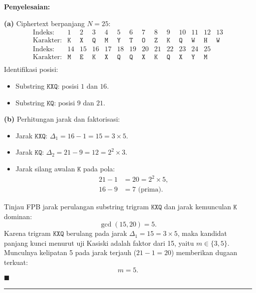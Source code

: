 \documentclass[11pt,a4paper]{article}
\newenvironment{solusi}{\noindent\textbf{\textsf{Penyelesaian:}}\par\vspace{0.2em}}{\hfill$\blacksquare$\vspace{1em}\par\hrule\vspace{1em}}
\begin{document}
\begin{solusi}
\textbf{(a)} Ciphertext berpanjang $N = 25$:
\[
\begin{array}{l*{13}{c}}
\text{Indeks:} & 1 & 2 & 3 & 4 & 5 & 6 & 7 & 8 & 9 & 10 & 11 & 12 & 13 \\
\text{Karakter:} & \texttt{K} & \texttt{X} & \texttt{Q} & \texttt{M} & \texttt{Y} & \texttt{T} & \texttt{O} & \texttt{Z} & \texttt{K} & \texttt{Q} & \texttt{W} & \texttt{H} & \texttt{W} \\[0.5em]
\text{Indeks:} & 14 & 15 & 16 & 17 & 18 & 19 & 20 & 21 & 22 & 23 & 24 & 25 & \\
\text{Karakter:} & \texttt{M} & \texttt{E} & \texttt{K} & \texttt{X} & \texttt{Q} & \texttt{Q} & \texttt{X} & \texttt{K} & \texttt{Q} & \texttt{X} & \texttt{Y} & \texttt{M} & \\
\end{array}
\]
Identifikasi posisi:
\begin{itemize}
    \item Substring $\texttt{KXQ}$: posisi $1$ dan $16$.
    \item Substring $\texttt{KQ}$: posisi $9$ dan $21$.
\end{itemize}

\textbf{(b)} Perhitungan jarak dan faktorisasi:
\begin{itemize}
    \item Jarak $\texttt{KXQ}$: $\Delta_1 = 16 - 1 = 15 = 3 \times 5$.
    \item Jarak $\texttt{KQ}$: $\Delta_2 = 21 - 9 = 12 = 2^2 \times 3$.
    \item Jarak silang awalan $\texttt{K}$ pada pola:
    \begin{align*}
    21 - 1 &= 20 = 2^2 \times 5, \\
    16 - 9 &= 7 \text{ (prima)}.
    \end{align*}
\end{itemize}
Tinjau FPB jarak perulangan substring trigram $\texttt{KXQ}$ dan jarak kemunculan $\texttt{K}$ dominan:
\[
\gcd(15, 20) = 5.
\]
Karena trigram $\texttt{KXQ}$ berulang pada jarak $\Delta_1 = 15 = 3 \times 5$, maka kandidat panjang kunci menurut uji Kasiski adalah faktor dari 15, yaitu $m \in \{3, 5\}$. Munculnya kelipatan 5 pada jarak terjauh ($21 - 1 = 20$) memberikan dugaan terkuat:
\[
m = 5.
\]
\end{solusi}
\end{document}
